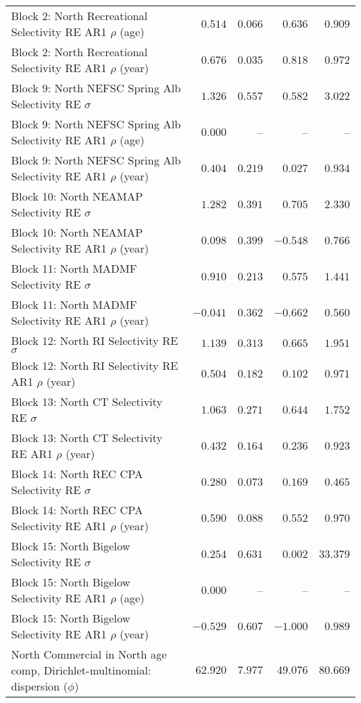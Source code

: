 \documentclass[
]{article}
\begin{document}
\begin{landscape}
\begin{longtable}[t]{lrrrr}
Block 2: North Recreational Selectivity RE AR1 $\rho$ (age) & $0.514$ & $0.066$ & $0.636$ & $0.909$\\
Block 2: North Recreational Selectivity RE AR1 $\rho$ (year) & $0.676$ & $0.035$ & $0.818$ & $0.972$\\
\addlinespace
Block 9: North NEFSC Spring Alb Selectivity RE $\sigma$ & $1.326$ & $0.557$ & $0.582$ & $3.022$\\
Block 9: North NEFSC Spring Alb Selectivity RE AR1 $\rho$ (age) & $0.000$ & -- & -- & --\\
Block 9: North NEFSC Spring Alb Selectivity RE AR1 $\rho$ (year) & $0.404$ & $0.219$ & $0.027$ & $0.934$\\
Block 10: North NEAMAP Selectivity RE $\sigma$ & $1.282$ & $0.391$ & $0.705$ & $2.330$\\
Block 10: North NEAMAP Selectivity RE AR1 $\rho$ (year) & $0.098$ & $0.399$ & $-0.548$ & $0.766$\\
\addlinespace
Block 11: North MADMF Selectivity RE $\sigma$ & $0.910$ & $0.213$ & $0.575$ & $1.441$\\
Block 11: North MADMF Selectivity RE AR1 $\rho$ (year) & $-0.041$ & $0.362$ & $-0.662$ & $0.560$\\
Block 12: North RI Selectivity RE $\sigma$ & $1.139$ & $0.313$ & $0.665$ & $1.951$\\
Block 12: North RI Selectivity RE AR1 $\rho$ (year) & $0.504$ & $0.182$ & $0.102$ & $0.971$\\
Block 13: North CT Selectivity RE $\sigma$ & $1.063$ & $0.271$ & $0.644$ & $1.752$\\
\addlinespace
Block 13: North CT Selectivity RE AR1 $\rho$ (year) & $0.432$ & $0.164$ & $0.236$ & $0.923$\\
Block 14: North REC CPA Selectivity RE $\sigma$ & $0.280$ & $0.073$ & $0.169$ & $0.465$\\
Block 14: North REC CPA Selectivity RE AR1 $\rho$ (year) & $0.590$ & $0.088$ & $0.552$ & $0.970$\\
Block 15: North Bigelow Selectivity RE $\sigma$ & $0.254$ & $0.631$ & $0.002$ & $33.379$\\
Block 15: North Bigelow Selectivity RE AR1 $\rho$ (age) & $0.000$ & -- & -- & --\\
\addlinespace
Block 15: North Bigelow Selectivity RE AR1 $\rho$ (year) & $-0.529$ & $0.607$ & $-1.000$ & $0.989$\\
North Commercial in North age comp, Dirichlet-multinomial: dispersion ($\phi$) & $62.920$ & $7.977$ & $49.076$ & $80.669$\\

\end{longtable}
\end{landscape}
\end{document}
